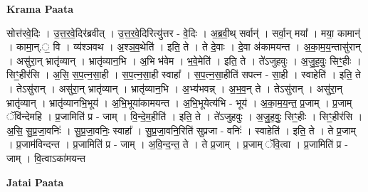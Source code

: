 \documentclass[17pt]{extarticle}
\begin{document}
\textbf{Krama Paata} \newline

सोत्त॑रवे॒दिः । उ॒त्त॒र॒वे॒दिर॑ब्रवीत् । उ॒त्त॒र॒वे॒दिरित्यु॑त्तर - वे॒दिः । अ॒ब्र॒वी॒थ् सर्वान्॑ । सर्वा॒न् मया᳚ । मया॒ कामान्॑ । कामा॒न्.॒ वि । व्य॑श्ञवथ । अ॒श्ञ॒व॒थेति॑ । इति॒ ते । ते दे॒वाः । दे॒वा अ॑कामयन्त । अ॒का॒म॒य॒न्तासु॑रान् । असु॑रा॒न् भ्रातृ॑व्यान् । भ्रातृ॑व्यान॒भि । अ॒भि भ॑वेम । भ॒वे॒मेति॑ । इति॒ ते । ते॑ऽजुहवुः । अ॒जु॒ह॒वुः॒ सिꣳ॒॒हीः । सिꣳ॒॒हीर॑सि । अ॒सि॒ स॒प॒त्न॒सा॒ही । स॒प॒त्न॒सा॒ही स्वाहा᳚ । स॒प॒त्न॒सा॒हीति॑ सपत्न - सा॒ही । स्वाहेति॑ । इति॒ ते । तेऽसु॑रान् । असु॑रा॒न् भ्रातृ॑व्यान् । भ्रातृ॑व्यान॒भि । अ॒भ्य॑भवन्न् । अ॒भ॒व॒न् ते । तेऽसु॑रान् । असु॑रा॒न् भ्रातृ॑व्यान् । भ्रातृ॑व्यानभि॒भूय॑ । अ॒भि॒भूया॑कामयन्त । अ॒भि॒भूयेत्य॑भि - भूय॑ । अ॒का॒म॒य॒न्त॒ प्र॒जाम् । प्र॒जाम् ॅवि॑न्देमहि । प्र॒जामिति॑ प्र - जाम् । वि॒न्दे॒म॒हीति॑ । इति॒ ते । ते॑ऽजुहवुः । अ॒जु॒ह॒वुः॒ सिꣳ॒॒हीः । सिꣳ॒॒हीर॑सि । अ॒सि॒ सु॒प्र॒जा॒वनिः॑ । सु॒प्र॒जा॒वनिः॒ स्वाहा᳚ । सु॒प्र॒जा॒वनि॒रिति॑ सुप्रजा - वनिः॑ । स्वाहेति॑ । इति॒ ते । ते प्र॒जाम् । प्र॒जाम॑विन्दन्त । प्र॒जामिति॑ प्र - जाम् । अ॒वि॒न्द॒न्त॒ ते । ते प्र॒जाम् । प्र॒जाम् ॅवि॒त्वा । प्र॒जामिति॑ प्र - जाम् । वि॒त्वाऽका॑मयन्त \newline

\textbf{Jatai Paata} \newline
\end{document}
